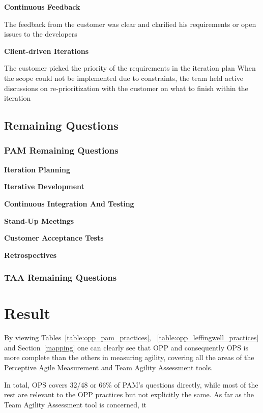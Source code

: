 \textbf{Continuous Feedback}
\begin{itemize}
	\pam The feedback from the customer was clear and clarified his requirements or open issues to the developers
\end{itemize}

\textbf{Client-driven Iterations}
\begin{itemize}
	\pam The customer picked the priority of the requirements in the iteration plan
	\pam When the scope could not be implemented due to constraints, the team held  active discussions on re-prioritization with the customer on what to finish within the iteration 
\end{itemize}

\subsection{Remaining Questions}

\subsubsection{PAM Remaining Questions}

\textbf{Iteration Planning}

\textbf{Iterative Development}

\textbf{Continuous Integration And Testing}

\textbf{Stand-Up Meetings}

\textbf{Customer Acceptance Tests}

\textbf{Retrospectives}

\subsubsection{TAA Remaining Questions}

\section{Result}
By viewing Tables~\ref{table:opp_pam_practices}, ~\ref{table:opp_leffingwell_practices} and Section~\ref{mapping} one can clearly see that OPP and consequently OPS is more complete than the others in measuring agility, covering all the areas of the Perceptive Agile Measurement and Team Agility Assessment tools.

In total, OPS covers 32/48 or 66\% of PAM's questions directly, while most of the rest are relevant to the OPP practices but not explicitly the same. As far as the Team Agility Assessment tool is concerned, it



